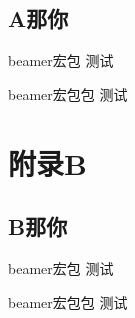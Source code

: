 \documentclass[hyperref, UTF8, CJK, aspectratio=169]{beamer}
\begin{document}
\subsection[short]{A那你}
\begin{frame}{beamer宏包}\label{frame:abc}
	测试
\end{frame}

\begin{frame}{beamer宏包包}\label{frame:adc}
	测试
\end{frame}

\section{附录B}
\subsection[short]{B那你}
\begin{frame}{beamer宏包}\label{frame:abd}
	测试
\end{frame}

\begin{frame}{beamer宏包包}\label{frame:add}
	测试
\end{frame}
\end{document}
